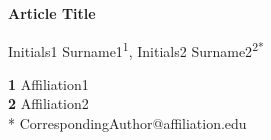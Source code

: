 \documentclass[10pt]{article}
\begin{document}
\def\makeLineNumber{\docolaction{\makeLineNumberLeft}{}{\makeLineNumberRight}}

\begin{center}
{\Large
\textbf{Article Title}
}
\end{center}

\begin{center}
Initials1 Surname1\textsuperscript{1},
Initials2 Surname2\textsuperscript{2*}
\end{center}

\begin{center}
{\bf 1} Affiliation1
\\
{\bf 2} Affiliation2
\\
* CorrespondingAuthor@affiliation.edu
\bigskip
\end{center}

\linenumbers
\end{document}
